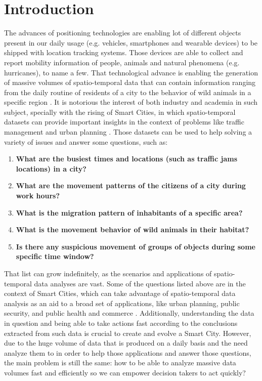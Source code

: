 \chapter{Introduction}
\label{chp:introduction}
The advances of positioning technologies are enabling lot of different objects present in our daily usage (e.g.
vehicles, smartphones and wearable devices) to be shipped with location tracking systems. Those devices are able to
collect and report mobility information of people, animals and natural phenomena (e.g. hurricanes), to name a few. That
technological advance is enabling the generation of massive volumes of spatio-temporal data that can contain information
ranging from the daily routine of residents of a city \citep{whatdidyoudo} to the behavior of wild animals in a specific
region \citep{trajclustering}\citep{miningperiodic}. It is notorious the interest of both industry and academia in such
subject, specially with the rising of Smart Cities, in which spatio-temporal datasets can provide important insights in
the context of problems like traffic management and urban planning \citep{gissmartcities}\citep{parallelsmartcities}.
Those datasets can be used to help solving a variety of issues and answer some questions, such as:

\begin{enumerate}
    \item \textbf{What are the busiest times and locations (such as traffic jams locations) in a city?}
        \citep{visualtrafficjam}
    \item \textbf{What are the movement patterns of the citizens of a city during work hours?}
    \item \textbf{What is the migration pattern of inhabitants of a specific area?}
    \item \textbf{What is the movement behavior of wild animals in their habitat?} \citep{movemine}
    \item \textbf{Is there any suspicious movement of groups of objects during some specific time window?}
\end{enumerate}

That list can grow indefinitely, as the scenarios and applications of spatio-temporal data analyses are vast. Some of
the questions listed above are in the context of Smart Cities, which can take advantage of spatio-temporal data analysis
as an aid to a broad set of applications, like urban planning, public security, and public health and commerce
\citep{ieeesmartcities}. Additionally, understanding the data in question and being able to take actions fast according
to the conclusions extracted from such data is crucial to create and evolve a Smart City. However, due to the huge
volume of data that is produced on a daily basis and the need analyze them to in order to help those applications and
answer those questions, the main problem is still the same: how to be able to analyze massive data volumes fast and
efficiently so we can empower decision takers to act quickly?

